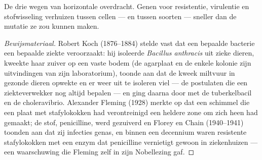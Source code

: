 \begin{omfigure}

{\small De drie wegen van horizontale overdracht. Genen voor
resistentie, virulentie en stofwisseling verhuizen tussen cellen --- en
tussen soorten --- sneller dan de mutatie ze zou kunnen maken.}
\end{omfigure}

\begin{proof}[Bewijsmateriaal]
Robert Koch (1876--1884) stelde vast dat een bepaalde bacterie een
bepaalde ziekte veroorzaakt: hij isoleerde \emph{Bacillus anthracis}
uit zieke dieren, kweekte haar zuiver op een vaste bodem (de agarplaat
en de enkele kolonie zijn uitvindingen van zijn laboratorium), toonde
aan dat de kweek miltvuur in gezonde dieren opwekte en er weer uit te
isoleren viel --- de postulaten die een ziekteverwekker nog altijd
bepalen --- en ging daarna door met de tuberkelbacil en de
choleravibrio. Alexander Fleming (1928) merkte op dat een schimmel die
een plaat met stafylokokken had verontreinigd een heldere zone om zich
heen had gemaakt; de stof, penicilline, werd gezuiverd en Florey en
Chain (1940--1941) toonden aan dat zij infecties genas, en binnen een
decennium waren resistente stafylokokken met een enzym dat penicilline
vernietigt gewoon in ziekenhuizen --- een waarschuwing die Fleming zelf
in zijn Nobellezing gaf.
\end{proof}

